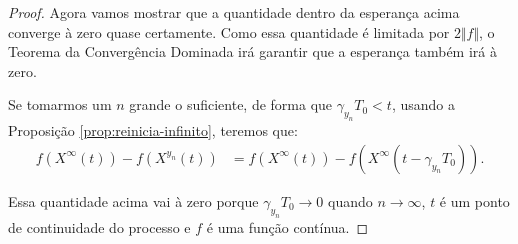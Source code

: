 \begin{proof}
  Agora vamos mostrar que a quantidade dentro da esperança acima
  converge à zero quase certamente. Como essa quantidade é limitada
  por $2 \Vert f \Vert$, o Teorema da Convergência Dominada irá
  garantir que a esperança também irá à zero.

  Se tomarmos um $n$ grande o suficiente, de forma que $\gamma_{y_n}
  T_0 < t$, usando a Proposição \ref{prop:reinicia-infinito}, teremos
  que:
  \begin{align*}
    f(X^{\infty}(t)) - f(X^{y_n}(t)) &=
    f(X^{\infty}(t)) - f(X^{\infty}(t-\gamma_{y_n} T_0)).
  \end{align*}

  Essa quantidade acima vai à zero \qc porque $\gamma_{y_n} T_0 \to 0$
  \qc quando $n \to \infty$, $t$ é \qc um ponto de continuidade do
  processo e $f$ é uma função contínua.
\end{proof}




